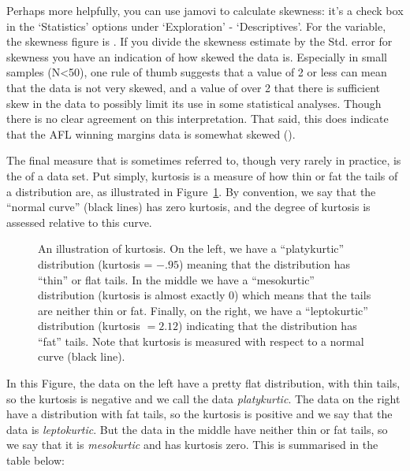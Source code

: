 Perhaps more helpfully, you can use jamovi to calculate skewness: it's a check box in the `Statistics' options under `Exploration' - `Descriptives'. For the  variable, the skewness figure is . If you divide the skewness estimate by the Std. error for skewness you have an indication of how skewed the data is. Especially in small samples (N<50), one rule of thumb suggests that a value of 2 or less can mean that the data is not very skewed, and a value of over 2 that there is sufficient skew in the data to possibly limit its use in some statistical analyses. Though there is no clear agreement on this interpretation. That said, this does indicate that the AFL winning margins data is somewhat skewed (). 

The final measure that is sometimes referred to, though very rarely in practice, is the  of a data set. Put simply, kurtosis is a measure of how thin or fat the tails of a distribution are, as illustrated in Figure~\ref{fig:kurtosis}. By convention, we say that the ``normal curve'' (black lines) has zero kurtosis, and the degree of kurtosis is assessed relative to this curve. 

\begin{figure}[htb]
\begin{center}
\caption{An illustration of kurtosis. On the left, we have a ``platykurtic'' distribution (kurtosis = $-.95$) meaning that the distribution has ``thin'' or flat tails. In the middle we have a ``mesokurtic'' distribution (kurtosis is almost exactly 0) which means that the tails are neither thin or fat. Finally, on the right, we have a ``leptokurtic'' distribution (kurtosis $= 2.12$) indicating that the distribution has ``fat'' tails. Note that kurtosis is measured with respect to a normal curve (black line).}
\label{fig:kurtosis}
\HR
\end{center}
\end{figure}

In this Figure, the data on the left have a pretty flat distribution, with thin tails, so the kurtosis is negative and we call the data {\it platykurtic}. The data on the right have a distribution with fat tails, so the kurtosis is positive and we say that the data is {\it leptokurtic}. But the data in the middle have neither thin or fat tails, so we say that it is {\it mesokurtic} and has kurtosis zero. This is summarised in the table below:

